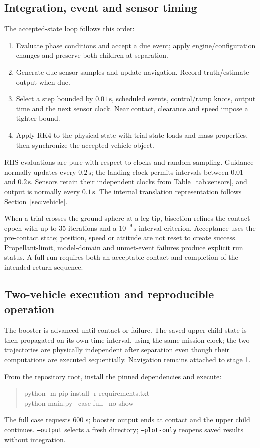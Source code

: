 \subsection{Integration, event and sensor timing}
The accepted-state loop follows this order:
\begin{enumerate}
\item Evaluate phase conditions and accept a due event; apply engine/configuration changes and preserve both children at separation.
\item Generate due sensor samples and update navigation. Record truth/estimate output when due.
\item Select a step bounded by $0.01\,\mathrm{s}$, scheduled events, control/ramp knots, output time and the next sensor clock. Near contact, clearance and speed impose a tighter bound.
\item Apply RK4 to the physical state with trial-state loads and mass properties, then synchronize the accepted vehicle object.
\end{enumerate}
RHS evaluations are pure with respect to clocks and random sampling. Guidance normally updates every $0.2\,\mathrm{s}$; the landing clock permits intervals between 0.01 and $0.2\,\mathrm{s}$. Sensors retain their independent clocks from Table~\ref{tab:sensors}, and output is normally every $0.1\,\mathrm{s}$. The internal translation representation follows Section~\ref{sec:vehicle}.

When a trial crosses the ground sphere at a leg tip, bisection refines the contact epoch with up to 35 iterations and a $10^{-9}\,\mathrm{s}$ interval criterion. Acceptance uses the pre-contact state; position, speed or attitude are not reset to create success. Propellant-limit, model-domain and unmet-event failures produce explicit run status. A full run requires both an acceptable contact and completion of the intended return sequence.

\subsection{Two-vehicle execution and reproducible operation}
The booster is advanced until contact or failure. The saved upper-child state is then propagated on its own time interval, using the same mission clock; the two trajectories are physically independent after separation even though their computations are executed sequentially. Navigation remains attached to stage 1.

From the repository root, install the pinned dependencies and execute:
\begin{quote}\ttfamily\small
python -m pip install -r requirements.txt\\
python main.py --case full --no-show
\end{quote}
The full case requests 600 s; booster output ends at contact and the upper child continues. \texttt{--output} selects a fresh directory; \texttt{--plot-only} reopens saved results without integration.

